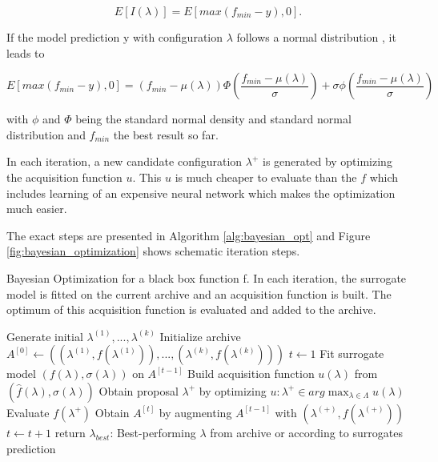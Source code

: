 \begin{equation}
	E[I(\lambda)] = E\left[max\left(f_{min}-y\right), 0\right].
\end{equation}

If the model prediction y with configuration $ \lambda $ follows a normal distribution \cite{feurer2019hyperparameter}, it leads to 

\begin{equation}
	E[max\left(f_{min}-y\right), 0] = \left(f_{min}-\mu(\lambda)\right) \Phi\left(\frac{f_{min}-\mu(\lambda)}{\sigma}\right) + \sigma \phi \left(\frac{f_{min}-\mu(\lambda)}{\sigma}\right)
\end{equation}

with $ \phi $ and $ \Phi $ being the standard normal density and standard normal distribution and $ f_{min} $ the best result so far. 


In each iteration, a new candidate configuration $ \lambda^+ $  is generated by optimizing the acquisition function $ u $. This $ u $ is much cheaper to evaluate than the $ f $ which includes learning of an expensive neural network which makes the optimization much easier.

The exact steps are presented in Algorithm \ref{alg:bayesian_opt} and Figure \ref{fig:bayesian_optimization} shows schematic iteration steps.

\begin{algorithm}[h!]
	\caption{Bayesian Optimization for a black box function f. In each iteration, the surrogate model is fitted on the current archive and an acquisition function is built. The optimum of this acquisition function is evaluated and added to the archive.}
	\label{alg:bayesian_opt}
	\begin{algorithmic}
		\State Generate initial $\lambda^{(1)}, ..., \lambda^{(k)} $
		\State Initialize archive $A^{[0]} \gets \left(\left(\lambda^{(1)}, f\left(\lambda^{(1)}\right)\right), ..., \left(\lambda^{(k)}, f\left(\lambda^{(k)}\right)\right)\right)$
		\State $ t \gets 1 $ 
			\State Fit surrogate model $ \left(f(\lambda), \sigma(\lambda)\right) $ on $ A^{[t-1]} $
			\State Build acquisition function $ u(\lambda) $ from $ \left(\hat{f}\left(\lambda\right), \sigma(\lambda)\right) $
			\State Obtain proposal $ \lambda^{+} $ by optimizing $ u: \lambda^+ \in arg\max_{\lambda \in \Lambda} u(\lambda) $
			\State Evaluate $ f\left(\lambda^+\right)$
			\State Obtain $A^[t]$ by augmenting $ A^{[t-1]} $ with $ \left(\lambda^{(+)}, f\left(\lambda^{(+)}\right)\right) $
			\State $ t \gets t+1 $
		\EndWhile
		\State return $ \lambda_{best} $: Best-performing $\lambda$ from archive or according to surrogates prediction
	\end{algorithmic}
\end{algorithm}


